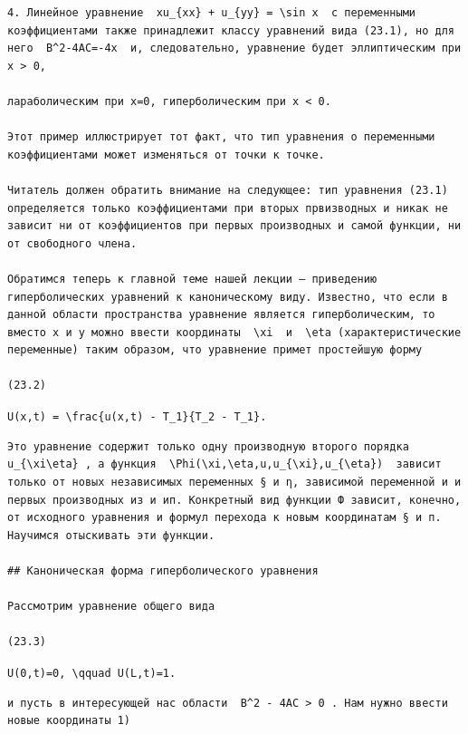 \documentclass[
  ukrainian,
]{article}
\begin{document}
\begin{verbatim}
4. Линейное уравнение  xu_{xx} + u_{yy} = \sin x  с переменными коэффициентами также принадлежит классу уравнений вида (23.1), но для него  B^2-4AC=-4x  и, следовательно, уравнение будет эллиптическим при x > 0,

лараболическим при x=0, гиперболическим при x < 0.

Этот пример иллюстрирует тот факт, что тип уравнения о переменными коэффициентами может изменяться от точки к точке.

Читатель должен обратить внимание на следующее: тип уравнения (23.1) определяется только коэффициентами при вторых првизводных и никак не зависит ни от коэффициентов при первых производных и самой функции, ни от свободного члена.

Обратимся теперь к главной теме нашей лекции — приведению гиперболических уравнений к каноническому виду. Известно, что если в данной области пространства уравнение является гиперболическим, то вместо x и y можно ввести координаты  \xi  и  \eta (характеристические переменные) таким образом, что уравнение примет простейшую форму

(23.2)
\end{verbatim}

\texttt{U(x,t)\ =\ \textbackslash{}frac\{u(x,t)\ -\ T\_1\}\{T\_2\ -\ T\_1\}.}

\begin{verbatim}
Это уравнение содержит только одну производную второго порядка  u_{\xi\eta} , а функция  \Phi(\xi,\eta,u,u_{\xi},u_{\eta})  зависит только от новых независимых переменных § и η, зависимой переменной и и первых производных из и ип. Конкретный вид функции Ф зависит, конечно, от исходного уравнения и формул перехода к новым координатам § и п. Научимся отыскивать эти функции.

## Каноническая форма гиперболического уравнения

Рассмотрим уравнение общего вида

(23.3)
\end{verbatim}

\texttt{U(0,t)=0,\ \textbackslash{}qquad\ U(L,t)=1.}

\begin{verbatim}
и пусть в интересующей нас области  B^2 - 4AC > 0 . Нам нужно ввести новые координаты 1)
\end{verbatim}
\end{document}
